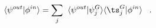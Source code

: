 \begin{equation}
\langle \psi^{out} \vert \phi^{in}\rangle =
\sum_j \;\; \langle \psi^{out} 
\vert \psi^G_j\rangle\langle \ts^G_j\vert \phi^{in}\rangle \;\;\; .
\label{eq:partid}
\end{equation}

